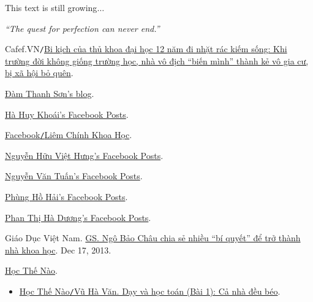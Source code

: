 \documentclass{article}
\numberwithin{equation}{section}
\begin{document}
This text is still growing$\ldots$
\begin{flushright}
	\textit{``The quest for perfection can never end.''}
\end{flushright}


\begin{thebibliography}{99}
	 Cafef.VN\texttt{/}\href{https://cafef.vn/chi-vi-1-lua-chon-sai-lam-trong-su-nghiep-hoc-gia-hang-dau-bit-phai-danh-doi-ca-cuoc-doi-nhat-rac-lang-thang-suot-12-nam-moi-nhan-ra-hoa-giai-voi-chinh-minh-la-viec-kho-lam-nhat-20220221131928932.chn?fbclid=IwAR2CafAOyG7NEOuxUXGPOsadQI_K8vMHfokm-OS5SfBIiUCMYnDvD4SfO60}{Bi kịch của thủ khoa đại học 12 năm đi nhặt rác kiếm sống: Khi trường đời không giống trường học, nhà vô địch ``biến mình'' thành kẻ vô gia cư, bị xã hội bỏ quên}.
	
	 \href{https://damtson.wordpress.com/}{Đàm Thanh Sơn's blog}.
	
	 \href{https://www.facebook.com/hahuy.khoai}{Hà Huy Khoái's Facebook Posts}.
	
	 \href{https://www.facebook.com/groups/LiemChinhKhoaHoc}{Facebook\texttt{/}Liêm Chính Khoa Học}.
	
	 \href{https://www.facebook.com/nhvhung}{Nguyễn Hữu Việt Hưng's Facebook Posts}.
	
	 \href{https://www.facebook.com/t.nguyen.2016}{Nguyễn Văn Tuấn's Facebook Posts}.
	
	 \href{https://www.facebook.com/hai.phungho.5}{Phùng Hồ Hải's Facebook Posts}.
	
	 \href{https://www.facebook.com/phan.t.duong.9}{Phan Thị Hà Dương's Facebook Posts}.
	
	 Giáo Dục Việt Nam. \href{https://giaoduc.net.vn/giao-duc-24h/gs-ngo-bao-chau-chia-se-nhieu-bi-quyet-de-tro-thanh-nha-khoa-hoc-post135782.gd}{GS. Ngô Bảo Châu chia sẻ nhiều ``bí quyết'' để trở thành nhà khoa học}. Dec 17, 2013.
	
	 \href{http://hocthenao.vn/}{Học Thế Nào}.
	\begin{itemize}
		\item  \href{http://hocthenao.vn/day-va-hoc-toan-bai-1-ca-nha-deu-beo/}{Học Thế Nào\texttt{/}Vũ Hà Văn. Dạy và học toán (Bài 1): Cả nhà đều béo}.
	\end{itemize}
	

\end{thebibliography}
\end{document}

